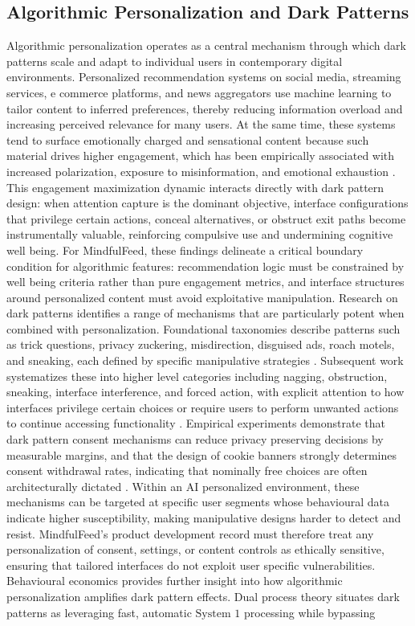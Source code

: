 \documentclass{article}
\begin{document}
\subsection{Algorithmic Personalization and Dark Patterns}
\label{sec:alg_personalization_dark_patterns} Algorithmic personalization operates as a central mechanism through which dark patterns scale and adapt to individual users in contemporary digital environments. Personalized recommendation systems on social media, streaming services, e commerce platforms, and news aggregators use machine learning to tailor content to inferred preferences, thereby reducing information overload and increasing perceived relevance for many users. At the same time, these systems tend to surface emotionally charged and sensational content because such material drives higher engagement, which has been empirically associated with increased polarization, exposure to misinformation, and emotional exhaustion \parencites[5]{9300898}. This engagement maximization dynamic interacts directly with dark pattern design: when attention capture is the dominant objective, interface configurations that privilege certain actions, conceal alternatives, or obstruct exit paths become instrumentally valuable, reinforcing compulsive use and undermining cognitive well being. For MindfulFeed, these findings delineate a critical boundary condition for algorithmic features: recommendation logic must be constrained by well being criteria rather than pure engagement metrics, and interface structures around personalized content must avoid exploitative manipulation. Research on dark patterns identifies a range of mechanisms that are particularly potent when combined with personalization. Foundational taxonomies describe patterns such as trick questions, privacy zuckering, misdirection, disguised ads, roach motels, and sneaking, each defined by specific manipulative strategies \parencites[2]{4807303}[4]{5678011}. Subsequent work systematizes these into higher level categories including nagging, obstruction, sneaking, interface interference, and forced action, with explicit attention to how interfaces privilege certain choices or require users to perform unwanted actions to continue accessing functionality \parencites[4]{5678011}. Empirical experiments demonstrate that dark pattern consent mechanisms can reduce privacy preserving decisions by measurable margins, and that the design of cookie banners strongly determines consent withdrawal rates, indicating that nominally free choices are often architecturally dictated \parencites[2]{4807303}[4]{5678011}. Within an AI personalized environment, these mechanisms can be targeted at specific user segments whose behavioural data indicate higher susceptibility, making manipulative designs harder to detect and resist. MindfulFeed's product development record must therefore treat any personalization of consent, settings, or content controls as ethically sensitive, ensuring that tailored interfaces do not exploit user specific vulnerabilities. Behavioural economics provides further insight into how algorithmic personalization amplifies dark pattern effects. Dual process theory situates dark patterns as leveraging fast, automatic $ \text{System 1} $ processing while bypassing 
\end{document}
